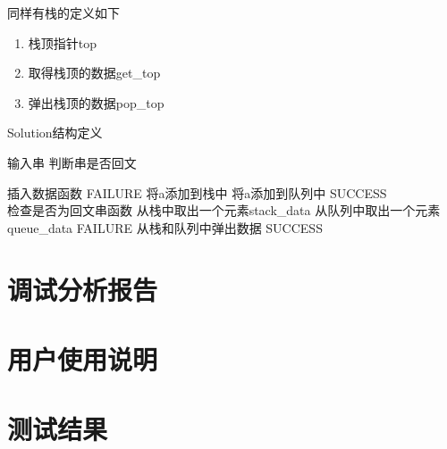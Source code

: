    同样有栈的定义如下
   \begin{enumerate}
      \item 栈顶指针top
      \item 取得栈顶的数据get\_top
      \item 弹出栈顶的数据pop\_top
   \end{enumerate}

\begin{algorithm}[htb] 
   \caption{ Solution结构定义 } 
   \label{alg:Framwork} 
   \begin{algorithmic}[1]
      \Require 输入串
      \Ensure 判断串是否回文
      
      \State 插入数据函数
            \State \Return FAILURE
         \EndIf
         \State 将a添加到栈中
         \State 将a添加到队列中
         \State \Return SUCCESS
      \EndFunction \\

      \State 检查是否为回文串函数
            \State 从栈中取出一个元素stack\_data
            \State 从队列中取出一个元素queue\_data
               \State \Return FAILURE
            \EndIf
            \State 从栈和队列中弹出数据
         \EndWhile
         \State \Return SUCCESS
      \EndFunction
   \end{algorithmic} 
   \end{algorithm}

\section{调试分析报告}

\section{用户使用说明}

\section{测试结果}


